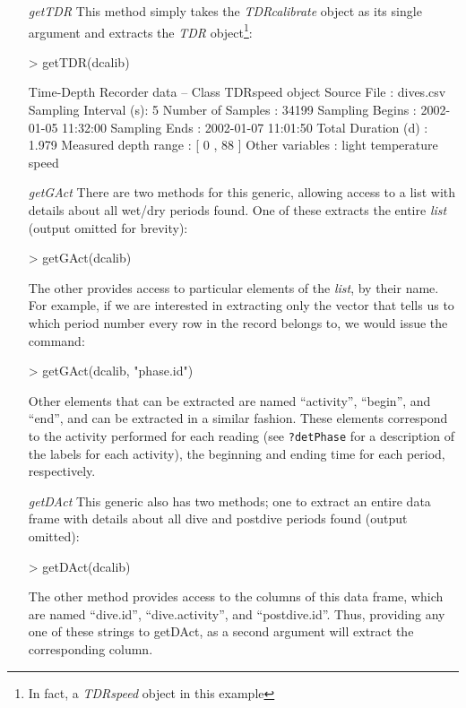 \documentclass[12pt, letterpaper]{scrartcl}
\newcommand{\Rclass}[1]{{\textit{#1}}}
\newcommand{\Rmethod}[1]{{\textit{#1}}}
\begin{document}
\begin{itemize}
\item [\Rmethod{getTDR}] This method simply takes the
  \Rclass{TDRcalibrate} object as its single argument and extracts the
  \Rclass{TDR} object\footnote{In fact, a \Rclass{TDRspeed} object in this
    example}:
\begin{Schunk}
\begin{Sinput}
> getTDR(dcalib)
\end{Sinput}
\begin{Soutput}
Time-Depth Recorder data -- Class TDRspeed object
  Source File          : dives.csv 
  Sampling Interval (s): 5 
  Number of Samples    : 34199 
  Sampling Begins      : 2002-01-05 11:32:00 
  Sampling Ends        : 2002-01-07 11:01:50 
  Total Duration (d)   : 1.979 
  Measured depth range : [ 0 , 88 ]
  Other variables      : light temperature speed 
\end{Soutput}
\end{Schunk}

\item [\Rmethod{getGAct}] There are two methods for this generic, allowing
  access to a list with details about all wet/dry periods found.  One of
  these extracts the entire \Rclass{list} (output omitted for brevity):
\begin{Schunk}
\begin{Sinput}
> getGAct(dcalib)
\end{Sinput}
\end{Schunk}
The other provides access to particular elements of the \Rclass{list}, by
their name.  For example, if we are interested in extracting only the
vector that tells us to which period number every row in the record
belongs to, we would issue the command:
\begin{Schunk}
\begin{Sinput}
> getGAct(dcalib, "phase.id")
\end{Sinput}
\end{Schunk}
Other elements that can be extracted are named ``activity'', ``begin'',
and ``end'', and can be extracted in a similar fashion.  These elements
correspond to the activity performed for each reading (see
\verb|?detPhase| for a description of the labels for each activity), the
beginning and ending time for each period, respectively.

\item [\Rmethod{getDAct}] This generic also has two methods; one to
  extract an entire data frame with details about all dive and postdive
  periods found (output omitted):
\begin{Schunk}
\begin{Sinput}
> getDAct(dcalib)
\end{Sinput}
\end{Schunk}
The other method provides access to the columns of this data frame, which
are named ``dive.id'', ``dive.activity'', and ``postdive.id''.  Thus,
providing any one of these strings to getDAct, as a second argument will
extract the corresponding column.


\end{itemize}
\end{document}

